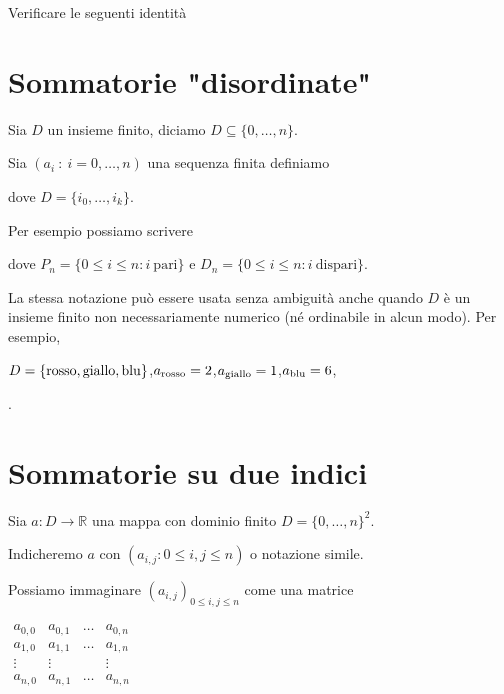 \documentclass[12pt,openany]{book}
\def\RR{\mathds R}
\theoremstyle{mio}
\theoremstyle{liscio}
\begin{document}
Verificare le seguenti identit\`a 







\clearpage\section{Sommatorie "disordinate"}
\label{sommatorie_disordinate}

Sia $D$ un insieme finito, diciamo $D\subseteq\{0,\dots,n\}$.

Sia $(a_i\ :\ i=0,\dots,n)$ una sequenza finita definiamo

\hfill dove $D=\{i_0,\dots,i_k\}$.

Per esempio possiamo scrivere



dove $P_n=\big\{0\le i\le n : i\ \textrm{pari}\big\}$\quad
e 
\quad$D_n=\big\{0\le i\le n : i\ \textrm{dispari}\big\}$.

La stessa notazione può essere usata senza ambiguità anche quando $D$ è un insieme finito non necessariamente numerico (né ordinabile in alcun modo). Per esempio, 

$D=\{{\rm rosso, giallo, blu}\}$,\hfil $a_{{\rm rosso}}=2$,\hfil $a_{{\rm giallo}}=1$,\hfil $a_{{\rm blu}}=6$,

.



\clearpage\section{Sommatorie su due indici}

Sia $a:D\to \RR$ una mappa con dominio finito  $D=\{0,\dots,n\}^2$.

Indicheremo $a$ con $(a_{i,j}: 0\le i,j\le n)$ o notazione simile.

Possiamo immaginare $(a_{i,j})_{0\le i,j\le n}$ come una matrice

\hspace*{20ex}
$\displaystyle\begin{array}{cccc}
a_{0,0}&a_{0,1}&\dots&a_{0,n}\\[1ex]
a_{1,0}&a_{1,1}&\dots&a_{1,n}\\[2ex]
\vdots&\vdots&&\vdots\\[2ex]
a_{n,0}&a_{n,1}&\dots&a_{n,n}\\
\end{array}$
\end{document}
